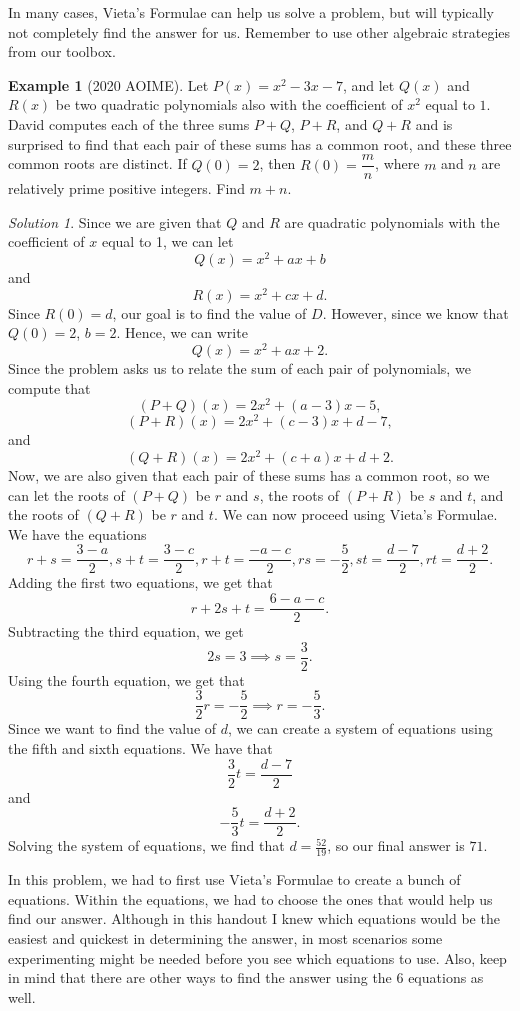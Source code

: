 \documentclass[l1pt]{article}
\theoremstyle{plain}
\theoremstyle{definition}
\newtheorem{example}[thm]{Example}
\theoremstyle{remark}
\newtheorem*{solution}{Solution}
\begin{document}
In many cases, Vieta's Formulae can help us solve a problem, but will typically not completely find the answer for us. Remember to use other algebraic strategies from our toolbox.

\begin{example}[2020 AOIME]
Let $P(x) = x^2 - 3x - 7$, and let $Q(x)$ and $R(x)$ be two quadratic polynomials also with the coefficient of $x^2$ equal to $1$. David computes each of the three sums $P + Q$, $P + R$, and $Q + R$ and is surprised to find that each pair of these sums has a common root, and these three common roots are distinct. If $Q(0) = 2$, then $R(0) = \dfrac mn$, where $m$ and $n$ are relatively prime positive integers. Find $m+n$.
\end{example}

\begin{solution}
Since we are given that $Q$ and $R$ are quadratic polynomials with the coefficient of $x$ equal to 1, we can let \[Q(x)=x^2+ax+b\] and \[R(x)=x^2+cx+d.\] Since $R(0)=d$, our goal is to find the value of $D$. However, since we know that $Q(0)=2$, $b=2$. Hence, we can write \[Q(x)=x^2+ax+2.\] Since the problem asks us to relate the sum of each pair of polynomials, we compute that  \[(P+Q)(x)=2x^2+(a-3)x-5,\] \[(P+R)(x)=2x^2+(c-3)x+d-7,\] and \[(Q+R)(x)=2x^2+(c+a)x+d+2.\] Now, we are also given that each pair of these sums has a common root, so we can let the roots of $(P+Q)$ be $r$ and $s$, the roots of $(P+R)$ be $s$ and $t$, and the roots of $(Q+R)$ be $r$ and $t$. We can now proceed using Vieta's Formulae. We have the equations \[r+s=\frac{3-a}{2}, s+t=\frac{3-c}{2}, r+t=\frac{-a-c}{2}, rs=-\frac{5}{2}, st=\frac{d-7}{2}, rt=\frac{d+2}{2}.\] Adding the first two equations, we get that \[r+2s+t=\frac{6-a-c}{2}.\]Subtracting the third equation, we get \[2s=3 \implies s=\frac{3}{2}.\] Using the fourth equation, we get that \[\frac{3}{2}r=-\frac{5}{2} \implies r=-\frac{5}{3}.\] Since we want to find the value of $d$, we can create a system of equations using the fifth and sixth equations. We have that \[\frac{3}{2}t=\frac{d-7}{2}\] and \[-\frac{5}{3}t=\frac{d+2}{2}.\]Solving the system of equations, we find that  $d=\frac{52}{19}$, so our final answer is $71.$


\end{solution}

\bigskip

In this problem, we had to first use Vieta's Formulae to create a bunch of equations. Within the equations, we had to choose the ones that would help us find our answer. Although in this handout I knew which equations would be the easiest and quickest in determining the answer, in most scenarios some experimenting might be needed before you see which equations to use. Also, keep in mind that there are other ways to find the answer using the 6 equations as well.
\end{document}
